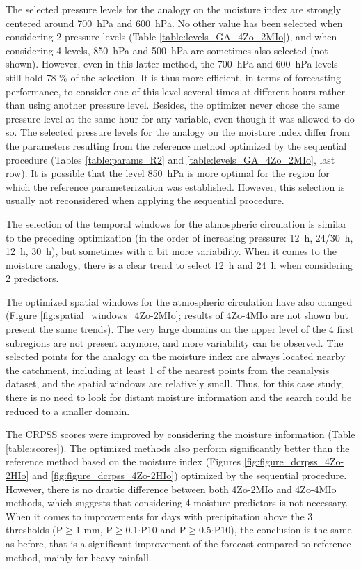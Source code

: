 \documentclass[5p]{elsarticle}
\begin{document}
The selected pressure levels for the analogy on the moisture index are strongly centered around 700~hPa and 600~hPa. No other value has been selected when considering 2 pressure levels (Table \ref{table:levels_GA_4Zo_2MIo}), and when considering 4 levels, 850~hPa and 500~hPa are sometimes also selected (not shown). However, even in this latter method, the 700~hPa and 600~hPa levels still hold 78 \% of the selection. It is thus more efficient, in terms of forecasting performance, to consider one of this level several times at different hours rather than using another pressure level. Besides, the optimizer never chose the same pressure level at the same hour for any variable, even though it was allowed to do so. The selected pressure levels for the analogy on the moisture index differ from the parameters resulting from the reference method optimized by the sequential procedure (Tables \ref{table:params_R2} and \ref{table:levels_GA_4Zo_2MIo}, last row). It is possible that the level 850~hPa is more optimal for the region for which the reference parameterization was established. However, this selection is usually not reconsidered when applying the sequential procedure.

The selection of the temporal windows for the atmospheric circulation is similar to the preceding optimization (in the order of increasing pressure: 12~h, 24/30~h, 12~h, 30~h), but sometimes with a bit more variability. When it comes to the moisture analogy, there is a clear trend to select 12~h and 24~h when considering 2 predictors.

The optimized spatial windows for the atmospheric circulation have also changed (Figure \ref{fig:spatial_windows_4Zo-2MIo}; results of 4Zo-4MIo are not shown but present the same trends). The very large domains on the upper level of the 4 first subregions are not present anymore, and more variability can be observed. The selected points for the analogy on the moisture index are always located nearby the catchment, including at least 1 of the nearest points from the reanalysis dataset, and the spatial windows are relatively small. Thus, for this case study, there is no need to look for distant moisture information and the search could be reduced to a smaller domain. 

The CRPSS scores were improved by considering the moisture information (Table \ref{table:scores}). The optimized methods also perform significantly better than the reference method based on the moisture index (Figures \ref{fig:figure_dcrpss_4Zo-2HIo} and \ref{fig:figure_dcrpss_4Zo-2HIo}) optimized by the sequential procedure. However, there is no drastic difference between both 4Zo-2MIo and 4Zo-4MIo methods, which suggests that considering 4 moisture predictors is not necessary. When it comes to improvements for days with precipitation above the 3 thresholds (P\(\geq\)1 mm, P\(\geq\)0.1\(\cdot\)P10 and P\(\geq\)0.5\(\cdot\)P10), the conclusion is the same as before, that is a significant improvement of the forecast compared to reference method, mainly for heavy rainfall.
\end{document}

